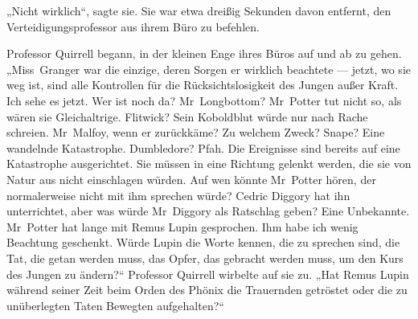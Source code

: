 „Nicht wirklich“, sagte sie. Sie war etwa dreißig Sekunden davon entfernt, den Verteidigungsprofessor aus ihrem Büro zu befehlen.

Professor Quirrell begann, in der kleinen Enge ihres Büros auf und ab zu gehen.
„Miss~Granger war die einzige, deren Sorgen er wirklich beachtete — jetzt, wo sie weg ist, sind alle Kontrollen für die Rücksichtslosigkeit des Jungen außer Kraft. Ich sehe es jetzt. Wer ist noch da? Mr~Longbottom? Mr~Potter tut nicht so, als wären sie Gleichaltrige. Flitwick? Sein Koboldblut würde nur nach Rache schreien. Mr~Malfoy, wenn er zurückkäme? Zu welchem Zweck? Snape? Eine wandelnde Katastrophe. Dumbledore? Pfah. Die Ereignisse sind bereits auf eine Katastrophe ausgerichtet. Sie müssen in eine Richtung gelenkt werden, die sie von Natur aus nicht einschlagen würden. Auf wen könnte Mr~Potter hören, der normalerweise nicht mit ihm sprechen würde? Cedric Diggory hat ihn unterrichtet, aber was würde Mr~Diggory als Ratschlag geben? Eine Unbekannte. Mr~Potter hat lange mit Remus Lupin gesprochen. Ihm habe ich wenig Beachtung geschenkt. Würde Lupin die Worte kennen, die zu sprechen sind, die Tat, die getan werden muss, das Opfer, das gebracht werden muss, um den Kurs des Jungen zu ändern?“
Professor Quirrell wirbelte auf sie zu.
„Hat Remus Lupin während seiner Zeit beim Orden des Phönix die Trauernden getröstet oder die zu unüberlegten Taten Bewegten aufgehalten?“

